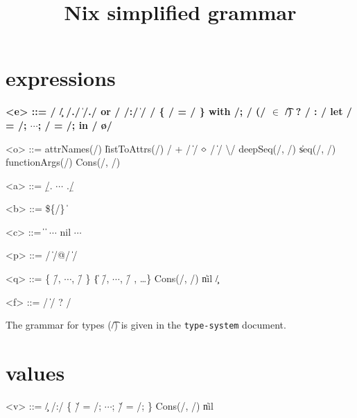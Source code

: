 

\title{Nix simplified grammar}


\maketitle{}

\section{expressions}

\begin{grammar}
  \bfseries
  <e> ::=
    \x/ \| \c/
    \alt \e/.\a/ \| \e/.\a/ or \e/
    \alt \p/:\e/ \| \e/ \e/
    \alt \{ \e/ = \e/ \}
    \alt with \e/; \e/
    \alt (\e/ $\bm{\in}$ \t/) ? \e/ : \e/
    \alt let \x/ = \e/; $\cdots{}$; \x/ = \e/; in \e/
    \alt \o/

    <o> ::= attrNames(\e/) \| listToAttrs(\e/)
    \alt \e/ + \e/ \| \e/ $\diamond$ \e/ \| \e/ \textbackslash \e/
    \alt deepSeq(\e/, \e/) \| seq(\e/, \e/)
    \alt functionArgs(\e/)
    \alt Cons(\e/, \e/)

  <a> ::= \b/. $\cdots{}$ .\b/

  <b> ::= \$\{\e/\} \| 

  <c> ::=  \|  \| $\cdots{}$
    \alt nil
    \alt $\cdots{}$

  <p> ::= \q/ \| \q/@\x/ \| \x/

  <q> ::= \{ \f/, $\cdots{}$, \f/ \} \| \{ \f/, $\cdots{}$, \f/ , \ldots{}\}
    \alt Cons(\x/, \x/) \| nil
    \alt \c/

  <f> ::= \x/ \| \x/ ? \e/

\end{grammar}

The grammar for types (\t/) is given in the \texttt{type-system} document.


\section{values}

\begin{grammar}
  \bfseries

  <v> ::=
    \c/
    \alt \p/:\e/
    \alt \{ \v/ = \e/; $\cdots{}$; \v/ = \e/; \}
    \alt Cons(\e/, \e/) \| nil
\end{grammar}

